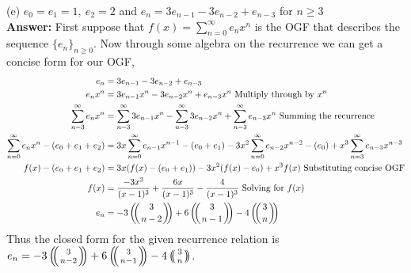 \documentclass{amsart}
\def\multiset#1#2{\ensuremath{\left(\kern-.3em\left(\genfrac{}{}{0pt}{}{#1}{#2}\right)\kern-.3em\right)}}
\newcommand{\textmultiset}[2]{\bigl(\!{\binom{#1}{#2}}\!\bigr)}
\newcommand{\displaymultiset}[2]{\left(\!{\binom{#1}{#2}}\!\right)}
\newcommand\multiset[2]{\mathchoice{\displaymultiset{#1}{#2}}
                                {\textmultiset{#1}{#2}}
                                {\textmultiset{#1}{#2}}
                                {\textmultiset{#1}{#2}}}
\begin{document}
\begin{enumerate}
	 (e) $e_0=e_1=1,\:e_2=2$ and $e_n=3e_{n-1}-3e_{n-2}+e_{n-3}$ for $n\geq 3$\\
	
	\textbf{Answer:} First suppose that $f(x) = \sum_{n = 0}^{\infty} e_n x^n$ is the OGF that describes the sequence $\{e_n\}_{n\geq0}$. Now through some algebra on the recurrence we can get a concise form for our OGF,
	 \begin{align*}
	 e_n&=3e_{n-1}-3e_{n-2}+e_{n-3}\\
	 e_nx^n&=3e_{n-1}x^n-3e_{n-2}x^n+e_{n-3}x^n \text{   Multiply through by $x^n$}\\
	 \sum_{n = 3}^{\infty} e_nx^n&=\sum_{n = 3}^{\infty} 3e_{n-1}x^n- \sum_{n = 3}^{\infty} 3e_{n-2}x^n+ \sum_{n = 3}^{\infty}e_{n-3}x^n  \text{ Summing the recurrence}\\
 	 \sum_{n = 0}^{\infty} e_nx^n - (e_0+e_1+e_2)&=3x\sum_{n = 0}^{\infty}e_{n-1}x^{n-1}-(e_0 + e_1) - 3x^2\sum_{n = 0}^{\infty} e_{n-2}x^{n-2}-(e_0)+ x^3\sum_{n = 3}^{\infty}e_{n-3}x^{n-3} \\
	  f(x) - (e_0+e_1+e_2)&=3x(f(x)-(e_0 + e_1)) - 3x^2(f(x)-e_0)+ x^3f(x) \text{   Substituting concise OGF}\\
	  f(x) &= \frac{-3x^2}{(x-1)^3}+\frac{6x}{(x-1)^3}-\frac{4}{(x-1)^3} \text{   Solving for $f(x)$}\\
	  e_n &= -3\multiset{3}{n-2}+6\multiset{3}{n-1}-4\multiset{3}{n}
	 \end{align*}
	 Thus the closed form for the given recurrence relation is $  e_n = -3\multiset{3}{n-2}+6\multiset{3}{n-1}-4\multiset{3}{n}$.

	\vspace{.5 in}


\end{enumerate}
\end{document}
